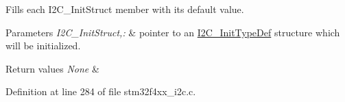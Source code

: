 Fills each I2\-C\-\_\-\-Init\-Struct member with its default value. 


\begin{DoxyParams}{Parameters}
{\em I2\-C\-\_\-\-Init\-Struct,\-:} & pointer to an \hyperlink{struct_i2_c___init_type_def}{I2\-C\-\_\-\-Init\-Type\-Def} structure which will be initialized. \\
\hline
\end{DoxyParams}

\begin{DoxyRetVals}{Return values}
{\em None} & \\
\hline
\end{DoxyRetVals}


Definition at line 284 of file stm32f4xx\-\_\-i2c.\-c.

